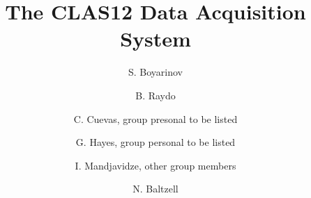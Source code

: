 \title{The CLAS12 Data Acquisition System}

\author[A]{S. Boyarinov}
\author[A]{B. Raydo}
\author[A]{C. Cuevas, group presonal to be listed}
\author[A]{G. Hayes, group personal to be listed}
\author[B]{I. Mandjavidze, other group members}
\author[A]{N. Baltzell}

\address[A]{Thomas Jefferson National Accelerator Facility, Newport News, VA, USA}
\address[B]{Sacley, France}
\address[C]{INFN, Milan, Italy}
